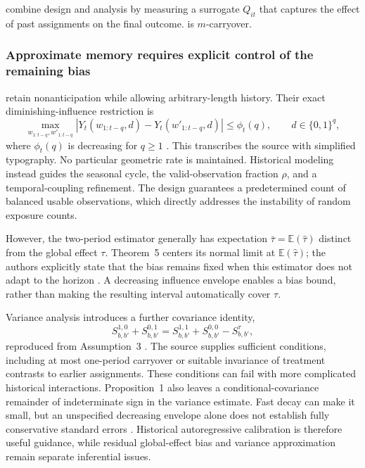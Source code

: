 \documentclass[12pt]{article}
\begin{document}
\citet{chen2026} combine design and analysis by measuring a surrogate $Q_{it}$ that captures the effect of past assignments on the final outcome.  \citep[Assumption~1, p.~4857; PDF p.~4]{chen2026} is $m$-carryover.
 
\subsubsection{Approximate memory requires explicit control of the remaining bias}

\citet{ni2025model} retain nonanticipation while allowing arbitrary-length history. Their exact diminishing-influence restriction is
\begin{equation}\label{eq:ni-history-envelope}
\max_{w_{1:t-q},w'_{1:t-q}}
\left|Y_t(w_{1:t-q},d)-Y_t(w'_{1:t-q},d)\right|
\leq\phi_t(q),\qquad d\in\{0,1\}^{q},
\end{equation}
where $\phi_t(q)$ is decreasing for $q\geq1$ \citep[Assumption~2, Eq.~(8), p.~14]{ni2025model}. This transcribes the source with simplified typography. No particular geometric rate is maintained. Historical modeling instead guides the seasonal cycle, the valid-observation fraction $\rho$, and a temporal-coupling refinement. The design guarantees a predetermined count of balanced usable observations, which directly addresses the instability of random exposure counts.

However, the two-period estimator generally has expectation $\bar\tau=\mathbb{E}(\widehat\tau)$ distinct from the global effect $\tau$. Theorem~5 centers its normal limit at $\mathbb{E}(\widehat\tau)$; the authors explicitly state that the bias remains fixed when this estimator does not adapt to the horizon \citep[p.~25]{ni2025model}. A decreasing influence envelope enables a bias bound, rather than making the resulting interval automatically cover $\tau$.

Variance analysis introduces a further covariance identity,
\begin{equation}\label{eq:ni-covariance-identity}
S_{b,b'}^{1,0}+S_{b,b'}^{0,1}
=S_{b,b'}^{1,1}+S_{b,b'}^{0,0}-S_{b,b'}^{\tau},
\end{equation}
reproduced from Assumption~3 \citep[pp.~18--19]{ni2025model}. The source supplies sufficient conditions, including at most one-period carryover or suitable invariance of treatment contrasts to earlier assignments. These conditions can fail with more complicated historical interactions. Proposition~1 also leaves a conditional-covariance remainder of indeterminate sign in the variance estimate. Fast decay can make it small, but an unspecified decreasing envelope alone does not establish fully conservative standard errors \citep[p.~26]{ni2025model}. Historical autoregressive calibration is therefore useful guidance, while residual global-effect bias and variance approximation remain separate inferential issues.
\end{document}
